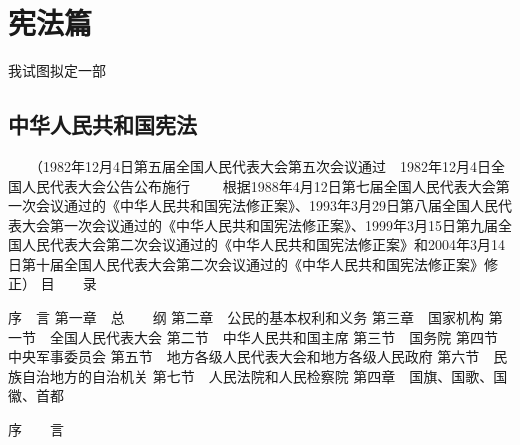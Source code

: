 \chapter{宪法篇}

我试图拟定一部


\section*{中华人民共和国宪法}
　　（1982年12月4日第五届全国人民代表大会第五次会议通过　1982年12月4日全国人民代表大会公告公布施行
　　根据1988年4月12日第七届全国人民代表大会第一次会议通过的《中华人民共和国宪法修正案》、1993年3月29日第八届全国人民代表大会第一次会议通过的《中华人民共和国宪法修正案》、1999年3月15日第九届全国人民代表大会第二次会议通过的《中华人民共和国宪法修正案》和2004年3月14日第十届全国人民代表大会第二次会议通过的《中华人民共和国宪法修正案》修正）  
目　　录
     
     序　言
     第一章　总　　纲
     第二章　公民的基本权利和义务
     第三章　国家机构
       第一节　全国人民代表大会
       第二节　中华人民共和国主席
       第三节　国务院
       第四节　中央军事委员会
       第五节　地方各级人民代表大会和地方各级人民政府
       第六节　民族自治地方的自治机关
       第七节　人民法院和人民检察院
     第四章　国旗、国歌、国徽、首都
     
序　　言
     
